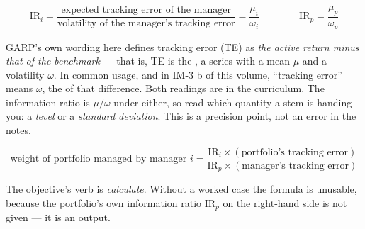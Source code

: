 \begin{imfmlbox}
\[ \text{IR}_i = \frac{\text{expected tracking error of the manager}}
                      {\text{volatility of the manager's tracking error}}
   = \frac{\mu_i}{\omega_i}
   \qquad\qquad
   \text{IR}_p = \frac{\mu_p}{\omega_p} \]
\end{imfmlbox}

\begin{imtrapbox}[breakable=false,title={``Tracking error'' means two different things}]
GARP's own wording here defines tracking error (TE) as \emph{the active return
minus that of the benchmark} --- that is, TE is the , a series with a mean $\mu$ and a volatility $\omega$. In common usage,
and in IM-3 b of this volume, ``tracking error'' means $\omega$, the
 of that difference. Both readings are in the curriculum. The
information ratio is $\mu/\omega$ under either, so read which quantity a stem is
handing you: a \emph{level} or a \emph{standard deviation}. This is a precision
point, not an error in the notes.
\end{imtrapbox}

\begin{imfmlbox}
\[ \text{weight of portfolio managed by manager } i =
   \frac{\text{IR}_i \times (\text{portfolio's tracking error})}
        {\text{IR}_p \times (\text{manager's tracking error})} \]
\end{imfmlbox}

\gapbadge
{}

\begin{imgapbox}[title={What the objective asks for}]
The objective's verb is \emph{calculate}. Without a worked case the formula is
unusable, because the portfolio's own information ratio $\text{IR}_p$ on the
right-hand side is not given --- it is an output.
\end{imgapbox}

